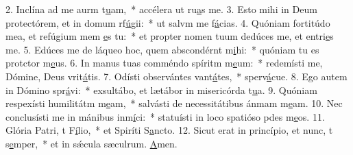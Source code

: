 2. Inclína ad me aurm t\uline{u}am,~* accélera ut ru\uline{a}s me.
3. Esto mihi in Deum protectórem, et in domum rf\uline{ú}gii:~* ut salvm me f\uline{á}cias.
4. Quóniam fortitúdo mea, et refúgium mem \uline{e}s tu:~* et propter nomen tuum dedúces me, et entri\uline{e}s me.
5. Edúces me de láqueo hoc, quem abscondérnt m\uline{i}hi:~* quóniam tu es protctor m\uline{e}us.
6. In manus tuas comméndo spíritm m\uline{e}um:~* redemísti me, Dómine, Deus vrit\uline{á}tis.
7. Odísti observántes vant\uline{á}tes,~* sperv\uline{á}cue.
8. Ego autem in Dómino spr\uline{á}vi:~* exsultábo, et lætábor in misericórda t\uline{u}a.
9. Quóniam respexísti humilitátm m\uline{e}am,~* salvásti de necessitátibus ánmam m\uline{e}am.
10. Nec conclusísti me in mánibus inm\uline{í}ci:~* statuísti in loco spatióso pdes m\uline{e}os.
11. Glória Patri, t F\uline{í}lio,~* et Spiríti S\uline{a}ncto.
12. Sicut erat in princípio, et nunc, t s\uline{e}mper,~* et in sǽcula sæculrum. \uline{A}men.
